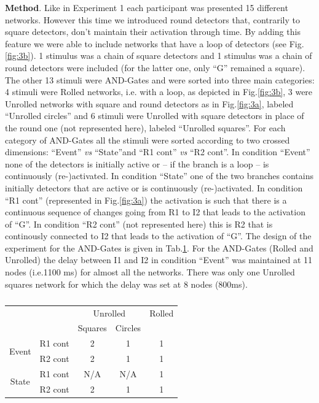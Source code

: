 \documentclass[10pt,letterpaper]{article}
\begin{document}
\textbf{Method}. Like in Experiment 1 each participant was presented 15 different networks. However this time we introduced round detectors that, contrarily to square detectors, don't maintain their activation through time. By adding this feature we were able to include networks that have a loop of detectors (see Fig.\ref{fig:3b}). 1 stimulus was a chain of square detectors and 1 stimulus was a chain of round detectors were included (for the latter one, only ``G'' remained a square). The other 13 stimuli were AND-Gates and were sorted into three main categories: 4 stimuli were Rolled networks, i.e. with a loop, as depicted in Fig.\ref{fig:3b}, 3 were Unrolled networks with square and round detectors as in Fig.\ref{fig:3a}, labeled ``Unrolled circles'' and 6 stimuli were Unrolled with square detectors in place of the round one (not represented here), labeled ``Unrolled squares''. For each category of AND-Gates all the stimuli were sorted according to two crossed dimensions: ``Event'' \textit{vs} ``State''and ``R1 cont'' \textit{vs} ``R2 cont''. In condition ``Event'' none of the detectors is initially active or -- if the branch is a loop -- is continuously (re-)activated. In condition ``State'' one of the two branches contains initially detectors that are active or is continuously (re-)activated. In condition ``R1 cont'' (represented in Fig.\ref{fig:3a}) the activation is such that there is a continuous sequence of changes going from R1 to I2 that leads to the activation of ``G''. In condition ``R2 cont'' (not represented here) this is R2 that is continously connected to I2 that leads to the activation of ``G''. The design of the experiment for the AND-Gates is given in Tab.\ref{tab:1}. For the AND-Gates (Rolled and Unrolled) the delay between I1 and I2 in condition ``Event'' was maintained at 11 nodes (i.e.1100 ms) for almost all the networks. There was only one Unrolled squares network for which the delay was set at 8 nodes (800ms).

\begin{table}[H]
\begin{center} 
\vskip 0.12in
\begin{tabular}{c|c|c|c|c} 
\hline
\multicolumn{2}{c}{}&\multicolumn{2}{|c|}{Unrolled} & Rolled\\
\cline{3-5}
\multicolumn{2}{c|}{}& Squares    &  Circles & \\
\cline{1-4}
\multirow{2}{*}{Event} & R1 cont & 2 & 1 & 1\\
 & R2 cont & 2 & 1 & 1\\
\hline
\multirow{2}{*}{State} & R1 cont & N/A & N/A & 1\\
 & R2 cont & 2 & 1 & 1\\
\hline
\end{tabular} 
\end{center}
\caption{}
\label{tab:1}
\end{table}
\end{document}

